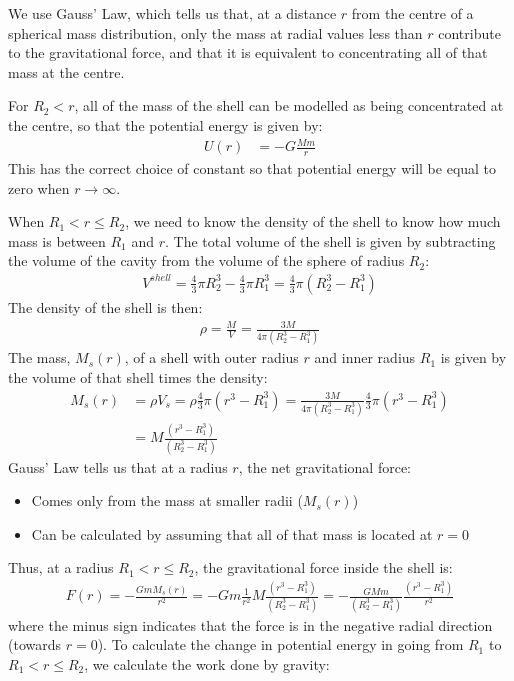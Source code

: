 \begin{solution}
We use Gauss' Law, which tells us that, at a distance $r$ from the centre of a spherical mass distribution, only the mass at radial values less than $r$ contribute to the gravitational force, and that it is equivalent to concentrating all of that mass at the centre.

For $R_2<r$, all of the mass of the shell can be modelled as being concentrated at the centre, so that the potential energy is given by:
\begin{align*}
U(r) &= -G\frac{Mm}{r}
\end{align*}
This has the correct choice of constant so that potential energy will be equal to zero when $r\to\infty$.

When  $R_1<r\leq R_2$, we need to know the density of the shell to know how much mass is between $R_1$ and $r$. The total volume of the shell is given by subtracting the volume of the cavity from the volume of the sphere of radius $R_2$:
\begin{align*}
V^{shell}=\frac{4}{3}\pi R_2^3-\frac{4}{3}\pi R_1^3=\frac{4}{3}\pi (R_2^3-R_1^3)
\end{align*}
The density of the shell is then:
\begin{align*}
\rho=\frac{M}{V}=\frac{3M}{4\pi (R_2^3-R_1^3)}
\end{align*}
The mass, $M_s(r)$, of a shell with outer radius $r$ and inner radius $R_1$ is given by the volume of that shell times the density:
\begin{align*}
M_s(r)&=\rho V_s=\rho \frac{4}{3}\pi (r^3-R_1^3)=\frac{3M}{4\pi (R_2^3-R_1^3)}\frac{4}{3}\pi (r^3-R_1^3)\\
&=M\frac{(r^3-R_1^3)}{(R_2^3-R_1^3)} 
\end{align*}
Gauss' Law tells us that at a radius $r$, the net gravitational force:
\begin{itemize}
\item Comes only from the mass at smaller radii ($M_s(r)$)
\item Can be calculated by assuming that all of that mass is located at $r=0$
\end{itemize}
Thus, at a radius $R_1<r\leq R_2$, the gravitational force inside the shell is:
\begin{align*}
F(r) = -\frac{GmM_s(r)}{r^2}=-Gm\frac{1}{r^2}M\frac{(r^3-R_1^3)}{(R_2^3-R_1^3)} = -\frac{GMm}{(R_2^3-R_1^3)}\frac{(r^3-R_1^3)}{r^2}
\end{align*}
where the minus sign indicates that the force is in the negative radial direction (towards $r=0$). To calculate the change in potential energy in going from $R_1$ to $R_1<r\leq R_2$, we calculate the work done by gravity:

\end{solution}
